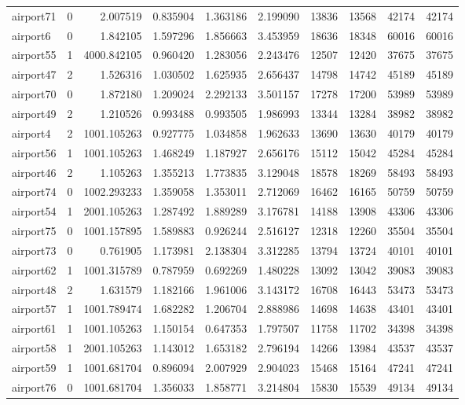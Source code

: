 \begin{longtable}{|l|r|r|r|r|r|r|r|r|r|}
airport71 & 0 & 2.007519 & 0.835904 & 1.363186 & 2.199090 & 13836 & 13568 & 42174 & 42174 \\
airport6 & 0 & 1.842105 & 1.597296 & 1.856663 & 3.453959 & 18636 & 18348 & 60016 & 60016 \\
airport55 & 1 & 4000.842105 & 0.960420 & 1.283056 & 2.243476 & 12507 & 12420 & 37675 & 37675 \\
airport47 & 2 & 1.526316 & 1.030502 & 1.625935 & 2.656437 & 14798 & 14742 & 45189 & 45189 \\
airport70 & 0 & 1.872180 & 1.209024 & 2.292133 & 3.501157 & 17278 & 17200 & 53989 & 53989 \\
airport49 & 2 & 1.210526 & 0.993488 & 0.993505 & 1.986993 & 13344 & 13284 & 38982 & 38982 \\
airport4 & 2 & 1001.105263 & 0.927775 & 1.034858 & 1.962633 & 13690 & 13630 & 40179 & 40179 \\
airport56 & 1 & 1001.105263 & 1.468249 & 1.187927 & 2.656176 & 15112 & 15042 & 45284 & 45284 \\
airport46 & 2 & 1.105263 & 1.355213 & 1.773835 & 3.129048 & 18578 & 18269 & 58493 & 58493 \\
airport74 & 0 & 1002.293233 & 1.359058 & 1.353011 & 2.712069 & 16462 & 16165 & 50759 & 50759 \\
airport54 & 1 & 2001.105263 & 1.287492 & 1.889289 & 3.176781 & 14188 & 13908 & 43306 & 43306 \\
airport75 & 0 & 1001.157895 & 1.589883 & 0.926244 & 2.516127 & 12318 & 12260 & 35504 & 35504 \\
airport73 & 0 & 0.761905 & 1.173981 & 2.138304 & 3.312285 & 13794 & 13724 & 40101 & 40101 \\
airport62 & 1 & 1001.315789 & 0.787959 & 0.692269 & 1.480228 & 13092 & 13042 & 39083 & 39083 \\
airport48 & 2 & 1.631579 & 1.182166 & 1.961006 & 3.143172 & 16708 & 16443 & 53473 & 53473 \\
airport57 & 1 & 1001.789474 & 1.682282 & 1.206704 & 2.888986 & 14698 & 14638 & 43401 & 43401 \\
airport61 & 1 & 1001.105263 & 1.150154 & 0.647353 & 1.797507 & 11758 & 11702 & 34398 & 34398 \\
airport58 & 1 & 2001.105263 & 1.143012 & 1.653182 & 2.796194 & 14266 & 13984 & 43537 & 43537 \\
airport59 & 1 & 1001.681704 & 0.896094 & 2.007929 & 2.904023 & 15468 & 15164 & 47241 & 47241 \\
airport76 & 0 & 1001.681704 & 1.356033 & 1.858771 & 3.214804 & 15830 & 15539 & 49134 & 49134 \\

\end{longtable}
